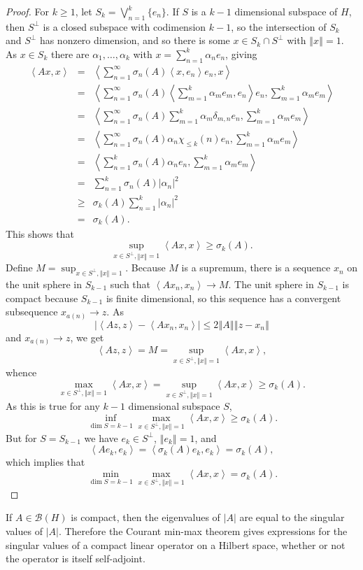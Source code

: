 \documentclass{article}
\newcommand{\inner}[2]{\left\langle #1, #2 \right\rangle}
\newcommand{\norm}[1]{\left\Vert #1 \right\Vert}
\theoremstyle{definition}
\begin{document}
\begin{proof}
For $k \geq 1$, let $S_k = \bigvee_{n=1}^k \{e_n\}$. 
If $S$ is a $k-1$ dimensional subspace of $H$, then $S^\perp$ is a closed subspace with codimension $k-1$, so
the intersection of $S_k$ and $S^\perp$ has nonzero dimension, and so there is some $x \in S_k \cap S^\perp$ with $\norm{x}=1$.
As $x \in S_k$ there are $\alpha_1,\ldots,\alpha_k$ with $x=\sum_{n=1}^k \alpha_n e_n$, giving
\begin{eqnarray*}
\inner{Ax}{x}&=&\inner{\sum_{n=1}^\infty \sigma_n(A) \inner{x}{e_n} e_n}{x}\\
&=&\inner{\sum_{n=1}^\infty \sigma_n(A) \inner{\sum_{m=1}^k \alpha_m e_m}{e_n} e_n}{\sum_{m=1}^k \alpha_m e_m}\\
&=&\inner{\sum_{n=1}^\infty \sigma_n(A) \sum_{m=1}^k \alpha_m \delta_{m,n} e_n}{\sum_{m=1}^k \alpha_m e_m}\\
&=&\inner{\sum_{n=1}^\infty \sigma_n(A)  \alpha_n \chi_{\leq k}(n)  e_n}{\sum_{m=1}^k \alpha_m e_m}\\
&=&\inner{\sum_{n=1}^k \sigma_n(A)  \alpha_n  e_n}{\sum_{m=1}^k \alpha_m e_m}\\
&=&\sum_{n=1}^k \sigma_n(A) |\alpha_n|^2\\
&\geq&\sigma_k(A) \sum_{n=1}^k  |\alpha_n|^2\\
&=&\sigma_k(A).
\end{eqnarray*}
This shows that
\[
\sup_{x \in S^\perp, \norm{x}=1} \inner{Ax}{x} \geq \sigma_k(A).
\]
Define $M=\sup_{x \in S^\perp, \norm{x}=1}$. Because $M$ is a supremum,
there is a sequence $x_n$ on the unit sphere in $S_{k-1}$ such that
$\inner{Ax_n}{x_n} \to M$.
The unit sphere in $S_{k-1}$ is compact because $S_{k-1}$ is finite dimensional, so this sequence has a convergent
subsequence $x_{a(n)} \to z$.
As
\[
|\inner{Az}{z}-\inner{Ax_n}{x_n}| \leq 2\norm{A} \norm{z-x_n}
\]
and $x_{a(n)} \to z$, we get
\[
\inner{Az}{z}=M=\sup_{x \in S^\perp, \norm{x}=1} \inner{Ax}{x},
\]
whence
\[
\max_{x \in S^\perp, \norm{x}=1} \inner{Ax}{x}=\sup_{x \in S^\perp, \norm{x}=1} \inner{Ax}{x} \geq \sigma_k(A).
\]
As this is true for any $k-1$ dimensional subspace $S$,
\[
\inf_{\dim S=k-1} \max_{x \in S^\perp, \norm{x}=1} \inner{Ax}{x} \geq \sigma_k(A).
\]
But for $S=S_{k-1}$ we have $e_k \in S^\perp$, $\norm{e_k}=1$, and
\[
\inner{Ae_k}{e_k}=\inner{\sigma_k(A) e_k}{e_k} =\sigma_k(A),
\]
which implies that
\[
\min_{\dim S=k-1} \max_{x \in S^\perp, \norm{x}=1} \inner{Ax}{x} = \sigma_k(A).
\]
\end{proof}

If $A \in \mathscr{B}(H)$ is compact, then the eigenvalues of $|A|$ are equal to the singular values of $|A|$. Therefore
the Courant min-max theorem gives expressions for the singular values of a compact linear operator on a Hilbert space, whether or not the operator
is itself self-adjoint.
\end{document}

